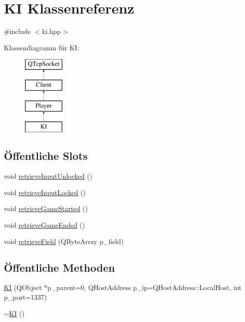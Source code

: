 \hypertarget{class_k_i}{}\section{K\+I Klassenreferenz}
\label{class_k_i}


{\ttfamily \#include $<$ki.\+hpp$>$}

Klassendiagramm für K\+I\+:\begin{figure}[H]
\begin{center}
\leavevmode
\includegraphics[height=4.000000cm]{class_k_i}
\end{center}
\end{figure}
\subsection*{Öffentliche Slots}
\begin{DoxyCompactItemize}
\item 
void \hyperlink{class_k_i_a1c69c3c3ef246e360bc5fc20823e4223}{retrieve\+Input\+Unlocked} ()
\item 
void \hyperlink{class_k_i_a1f807b37c8d3f39f05c7681bf64712e7}{retrieve\+Input\+Locked} ()
\item 
void \hyperlink{class_k_i_ace9a8c3acb7f18dc16ad5bf69323d558}{retrieve\+Game\+Started} ()
\item 
void \hyperlink{class_k_i_a16aea3f051dd748d5f5760bba3c4a2a5}{retrieve\+Game\+Ended} ()
\item 
void \hyperlink{class_k_i_a6c6fa186116552a3c56fb50b17c108a7}{retrieve\+Field} (Q\+Byte\+Array p\+\_\+field)
\end{DoxyCompactItemize}
\subsection*{Öffentliche Methoden}
\begin{DoxyCompactItemize}
\item 
\hyperlink{class_k_i_a3ae7913e44d90b9ddd784270e8c38575}{K\+I} (Q\+Object $\ast$p\+\_\+parent=0, Q\+Host\+Address p\+\_\+ip=Q\+Host\+Address\+::\+Local\+Host, int p\+\_\+port=1337)
\item 
\hyperlink{class_k_i_afd1109cfccff505f519d60d9958efad9}{$\sim$\+K\+I} ()
\end{DoxyCompactItemize}
